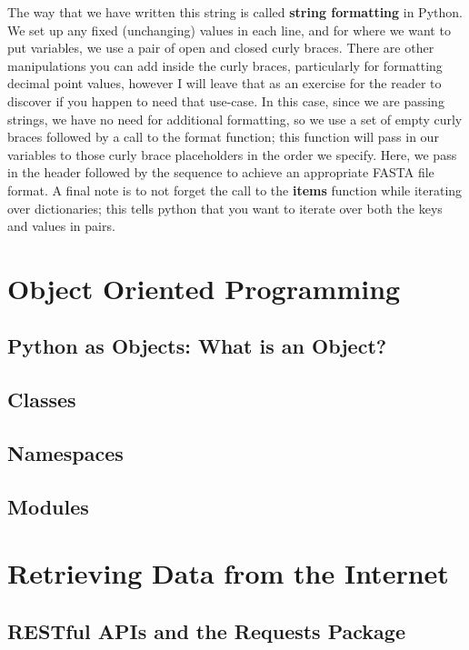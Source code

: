 \documentclass[a4paper,11pt]{article}
\begin{document}
The way that we have written this string is called \textbf{string formatting} in Python.  We 
set up any fixed (unchanging) values in each line, and for where we want to put variables, we 
use a pair of open and closed curly braces.  There are other manipulations you can add inside 
the curly braces, particularly for formatting decimal point values, however I will leave that 
as an exercise for the reader to discover if you happen to need that use-case.  In this case, 
since we are passing strings, we have no need for additional formatting, so we use a set of 
empty curly braces followed by a call to the format function; this function will pass in our 
variables to those curly brace placeholders in the order we specify.  Here, we pass in the header
followed by the sequence to achieve an appropriate FASTA file format.  A final note is to not 
forget the call to the \textbf{items} function while iterating over dictionaries; this tells 
python that you want to iterate over both the keys and values in pairs.

\pagebreak
\section{Object Oriented Programming}
\subsection{Python as Objects: What is an Object?}

\pagebreak
\subsection{Classes}

\pagebreak
\subsection{Namespaces}

\pagebreak
\subsection{Modules}

\pagebreak
\section{Retrieving Data from the Internet}
\subsection{RESTful APIs and the Requests Package}
\end{document}
